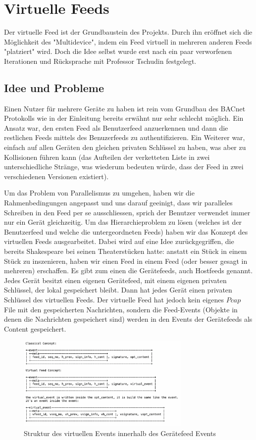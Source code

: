 \documentclass[a4paper,titlepage]{article}
\begin{document}
\section{Virtuelle Feeds}
Der virtuelle Feed ist der Grundbaustein des Projekts. Durch ihn eröffnet sich die Möglichkeit des "Multidevice", indem ein Feed virtuell in mehreren anderen Feeds "platziert" wird. Doch die Idee selbst wurde erst nach ein paar verworfenen Iterationen und Rücksprache mit Professor Tschudin festgelegt.

\subsection{Idee und Probleme}
Einen Nutzer für mehrere Geräte zu haben ist rein vom Grundbau des BACnet Protokolls wie in der Einleitung bereits erwähnt nur sehr schlecht möglich. Ein Ansatz war, den ersten Feed als Benutzerfeed anzuerkennen und dann die restlichen Feeds mittels des Benuzerfeeds zu authentifizieren. Ein Weiterer war, einfach auf allen Geräten den gleichen privaten Schlüssel zu haben, was aber zu Kollisionen führen kann (das Aufteilen der verketteten Liste in zwei unterschiedliche Stränge, was wiederum bedeuten würde, dass der Feed in zwei verschiedenen Versionen existiert).

Um das Problem von Parallelismus zu umgehen, haben wir die Rahmenbedingungen angepasst und uns darauf geeinigt, dass wir paralleles Schreiben in den Feed per se ausschliessen, sprich der Benutzer verwendet immer nur ein Gerät gleichzeitig. Um das Hierarchieproblem zu lösen (welches ist der Benutzerfeed und welche die untergeordneten Feeds) haben wir das Konzept des virtuellen Feeds ausgearbeitet. Dabei wird auf eine Idee zurückgegriffen, die bereits Shakespeare bei seinen Theaterstücken hatte: anstatt ein Stück in einem Stück zu inszenieren, haben wir einen Feed in einem Feed (oder besser gesagt in mehreren) erschaffen. Es gibt zum einen die Gerätefeeds, auch Hostfeeds genannt. Jedes Gerät besitzt einen eigenen Gerätefeed, mit einem eigenen privaten Schlüssel, der lokal gespeichert bleibt. Dann hat jedes Gerät einen privaten Schlüssel des virtuellen Feeds. Der virtuelle Feed hat jedoch kein eigenes $Pcap$ File mit den gespeicherten Nachrichten, sondern die Feed-Events (Objekte in denen die Nachrichten gespeichert sind) werden in den Events der Gerätefeeds als Content gespeichert.

\begin{figure}[h!]
   \centering
   \includegraphics[width=0.75\textwidth]{figures/vFeedStructure}  
   \caption*{Struktur des virtuellen Events innerhalb des Gerätefeed Events }
   \label{fig-virtual_event_structure}
\end{figure}
\end{document}
